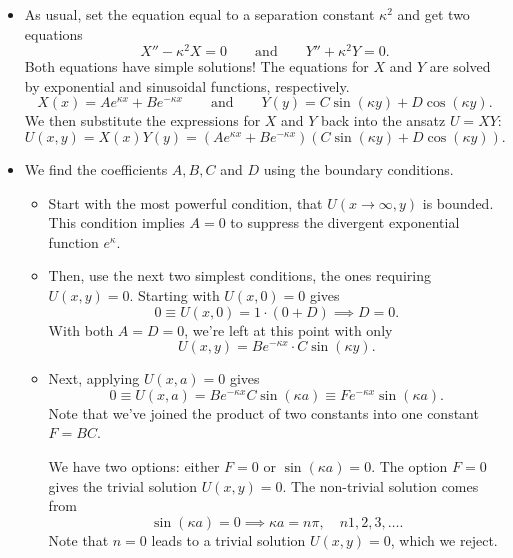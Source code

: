\documentclass[11pt, a4paper]{article}
\newcommand{\eqtext}[1]{\qquad \text{#1} \qquad}
\begin{document}
\begin{itemize}
	\item As usual, set the equation equal to a separation constant $ \kappa^{2} $ and get two equations
	\begin{equation*}
		X'' - \kappa^{2}X = 0 \eqtext{and} Y'' + \kappa^{2} Y = 0.
	\end{equation*}
	Both equations have simple solutions! The equations for $ X $ and $ Y $ are solved by exponential and sinusoidal functions, respectively.
	\begin{equation*}
		X(x) = Ae^{\kappa x} + Be^{-\kappa x} \eqtext{and} Y(y) = C\sin(\kappa y) + D\cos (\kappa y).
	\end{equation*}
	We then substitute the expressions for $ X $ and $ Y $ back into the ansatz $ U = XY $:
	\begin{equation*}
		U(x, y)  = X(x)Y(y) = \left(Ae^{\kappa x} + Be^{-\kappa x}\right)\left(C\sin(\kappa y) + D\cos (\kappa y)\right).
	\end{equation*}
	
	
	\item We find the coefficients $ A, B, C $ and $ D $ using the boundary conditions. 
	\begin{itemize}
		\item Start with the most powerful condition, that $ U(x \to \infty, y) $ is bounded. This condition implies $ A = 0 $ to suppress the divergent exponential function $ e^{\kappa } $. 
			
		\item Then, use the next two simplest conditions, the ones requiring $ U(x, y) = 0 $. Starting with $ U(x, 0) = 0 $ gives
		\begin{equation*}
			0 \equiv U(x, 0) = 1 \cdot (0 + D) \implies D = 0.
		\end{equation*}
		With both $ A = D = 0 $, we're left at this point with only 
		\begin{equation*}
			U(x, y) = Be^{-\kappa x} \cdot C \sin (\kappa y).
		\end{equation*}
		
		\item Next, applying $ U(x, a) = 0$ gives
		\begin{equation*}
			0 \equiv U(x, a) = Be^{-\kappa x} C \sin (\kappa a) \equiv F e^{-\kappa x} \sin (\kappa a).
		\end{equation*} 
		Note that we've joined the product of two constants into one constant $ F = BC $. 
		
		We have two options: either $ F = 0 $ or $ \sin (\kappa a) = 0$. The option $ F = 0 $ gives the trivial solution $ U(x, y) = 0 $. The non-trivial solution comes from 
		\begin{equation*}
			\sin(\kappa a ) = 0 \implies \kappa a = n \pi, \quad n 1, 2, 3, \ldots.
		\end{equation*}
		Note that $ n = 0 $ leads to a trivial solution $ U(x, y) = 0 $, which we reject.
		

\end{itemize}
\end{itemize}
\end{document}
